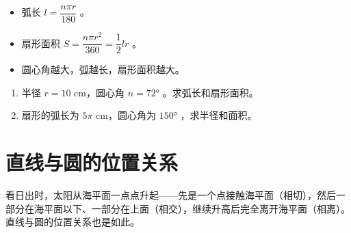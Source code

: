 \begin{keytakeaway}


\begin{itemize}
  \item 弧长 $l = \dfrac{n\pi r}{180}$ 。
  \item 扇形面积 $S = \dfrac{n\pi r^2}{360} = \dfrac{1}{2}lr$ 。
  \item 圆心角越大，弧越长，扇形面积越大。
\end{itemize}


\end{keytakeaway}

\begin{practice}


\begin{enumerate}
  \item 半径 $r = 10$ cm，圆心角 $n = 72°$ 。求弧长和扇形面积。
  \item 扇形的弧长为 $5\pi$ cm，圆心角为 $150°$ ，求半径和面积。
\end{enumerate}


\end{practice}



\section*{直线与圆的位置关系}


\begin{explore}


看日出时，太阳从海平面一点点升起——先是一个点接触海平面（相切），然后一部分在海平面以下、一部分在上面（相交），继续升高后完全离开海平面（相离）。直线与圆的位置关系也是如此。

\end{explore}

